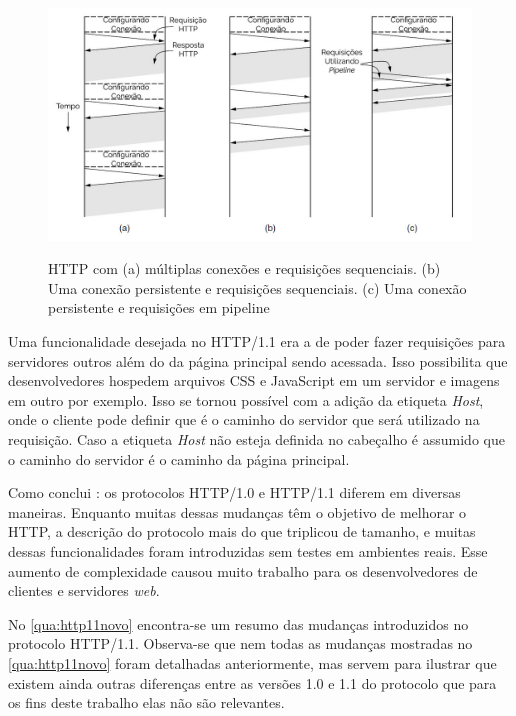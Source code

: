 \begin{figure}[!htb]
    \centering
    \caption{HTTP com (a) múltiplas conexões e requisições sequenciais. (b) Uma conexão persistente e requisições sequenciais. (c) Uma conexão persistente e requisições em pipeline}
    \includegraphics[width=1.0\textwidth]{./04-figuras/fund-teorica/httpconexaopersistente}
    \label{fig:httpconexaopersistente}
\end{figure}

Uma funcionalidade desejada no HTTP/1.1 era a de poder fazer requisições para servidores outros além do da página principal sendo acessada. Isso possibilita que desenvolvedores hospedem arquivos CSS e JavaScript em um servidor e imagens em outro por exemplo. Isso se tornou possível com a adição da etiqueta \textit{Host}, onde o cliente pode definir que é o caminho do servidor que será utilizado na requisição. Caso a etiqueta \textit{Host} não esteja definida no cabeçalho é assumido que o caminho do servidor é o caminho da página principal.

Como conclui \cite{KeyDifferencesHTTP}: os protocolos HTTP/1.0 e HTTP/1.1 diferem em diversas maneiras. Enquanto muitas dessas mudanças têm o objetivo de melhorar o HTTP, a descrição do protocolo mais do que triplicou de tamanho, e muitas dessas funcionalidades foram introduzidas sem testes em ambientes reais. Esse aumento de complexidade causou muito trabalho para os desenvolvedores de clientes e servidores \textit{web}. 

No \autoref{qua:http11novo} encontra-se um resumo das mudanças introduzidos no protocolo HTTP/1.1. Observa-se que nem todas as mudanças mostradas no \autoref{qua:http11novo} foram detalhadas anteriormente, mas servem para ilustrar que existem ainda outras diferenças entre as versões 1.0 e 1.1 do protocolo que para os fins deste trabalho elas não são relevantes.

